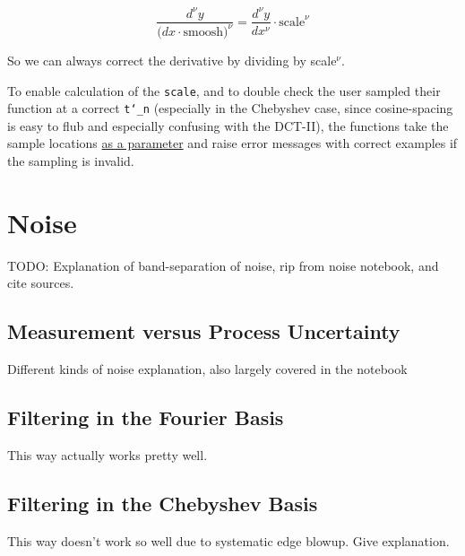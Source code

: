 \documentclass[10pt]{article}
\begin{document}
$$\frac{d^\nu y}{\big( dx \cdot \text{smoosh})^\nu} = \frac{d^\nu y}{dx^\nu} \cdot \text{scale}^\nu$$

So we can always correct the derivative by dividing by scale$^\nu$.\newline

To enable calculation of the \texttt{scale}, and to double check the user sampled their function at a correct \texttt{t\char`_n} (especially in the Chebyshev case, since cosine-spacing is easy to flub and especially confusing with the DCT-II), the functions take the sample locations \href{https://pavelkomarov.com/spectral-derivatives/specderiv.html}{as a parameter} and raise error messages with correct examples if the sampling is invalid.

\section{Noise}

TODO: Explanation of band-separation of noise, rip from noise notebook, and cite sources.

\subsection{Measurement versus Process Uncertainty}

Different kinds of noise explanation, also largely covered in the notebook

\subsection{Filtering in the Fourier Basis}

This way actually works pretty well.

\subsection{Filtering in the Chebyshev Basis}

This way doesn't work so well due to systematic edge blowup. Give explanation.

\printendnotes
\end{document}
